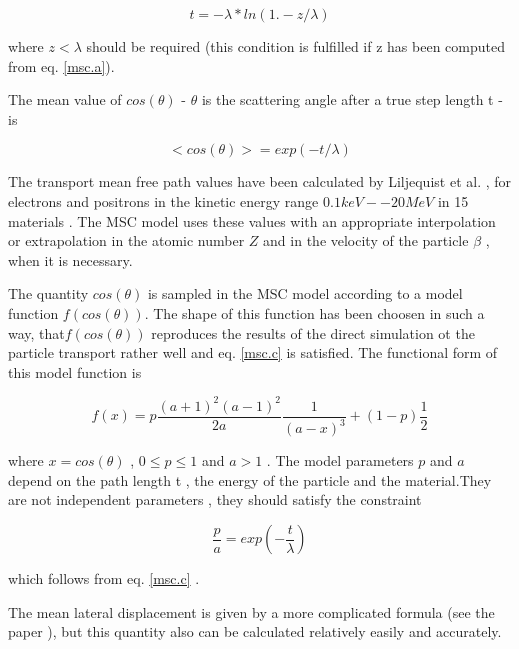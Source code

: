    \begin{equation}
        t = -\lambda*ln(1.-z/\lambda)                     \label{msc.b}
   \end{equation}

 where \(z < \lambda\) should be required (this condition is fulfilled
 if z has been computed from eq. \ref{msc.a}).

  The mean value of \(cos(\theta)\) - \(\theta\) is the scattering angle after a
true step length t - is

   \begin{equation}
          <cos(\theta)> = exp(-t/\lambda)               \label{msc.c}  
   \end{equation}

  The transport mean free path values have been calculated by Liljequist et al.
\cite{msc.liljequist2},\cite{msc.liljequist1} for electrons and positrons in the kinetic
energy range \(0.1 keV -- 20 MeV\) in 15 materials . The MSC model uses these
values with an appropriate interpolation or extrapolation in the atomic number
\(Z\) and in the velocity of the particle \(\beta\) , when it is necessary.
  
 The quantity \(cos(\theta)\) is sampled in the MSC model according to a model function
 \(f(cos(\theta))\). The shape of this function has been choosen in such a way,
that\(f(cos(\theta))\) reproduces the results of the direct simulation ot the particle
transport rather well and eq. \ref{msc.c} is satisfied.
 The functional form of this model function is

  \begin{equation}
      f(x) = p \frac{(a + 1)^2 (a - 1)^2}{2 a} \frac{1}{(a-x)^3}
            + (1-p) \frac{1}{2}                            \label{msc.d}
  \end{equation}

 where  \( x= cos(\theta)\) , \( 0 \leq p \leq 1\) and \( a > 1\) . The model
 parameters \(p\) and \(a\) depend on the path length t , the energy of the
 particle and the material.They are not independent parameters , they should
 satisfy the constraint

  \begin{equation}
        \frac{p}{a} = exp(-\frac{t}{\lambda})              \label{msc.e}
  \end{equation} 

 which follows from eq. \ref{msc.c} .

  The mean lateral displacement is given by a more complicated formula
(see the paper \cite{msc.fernandez} ), but this quantity also can be calculated
 relatively easily and accurately.
 
